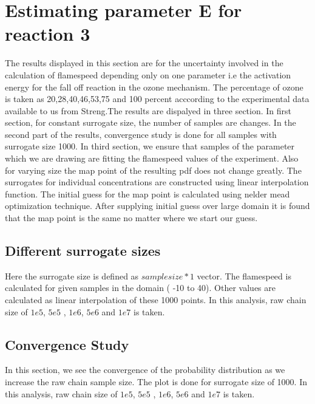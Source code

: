 
\section{Estimating parameter E for reaction 3 }

The results displayed in this section are for the uncertainty involved in the calculation of flamespeed depending only on one parameter i.e the activation energy for the fall off reaction in the ozone mechanism. The percentage of ozone is taken as 20,28,40,46,53,75 and 100  percent acccording to the experimental data available to us from Streng\cite{Streng}.The results are dispalyed in three section. In first section, for constant surrogate size, the number of samples are changes. In the second part of the results, convergence study is done for all samples with surrogate size 1000. In third section, we ensure that samples of the parameter which we are drawing are fitting the flamespeed values of the experiment. Also for varying size the map point of the resulting pdf does not change greatly. The surrogates for individual concentrations are constructed using linear interpolation function. The initial guess for the map point is calculated using nelder mead optimization technique. After supplying initial guess over large domain it is found that the map point is the same no matter where we start our guess. 
\bigskip

\subsection{Different surrogate sizes }

 Here the surrogate size is defined as $sample size*1$ vector. The flamespeed is calculated for given samples in the domain ( -10 to 40). Other values are calculated as linear interpolation of these 1000 points. In this analysis, raw chain size of $1e5$, $5e5$ , $1e6$, $5e6$ and $1e7$ is taken. 






\subsection{Convergence Study }

 In this section, we see the convergence of the probability distribution as we increase the raw chain sample size. The plot is done for surrogate size of 1000. In this analysis, raw chain size of $1e5$, $5e5$ , $1e6$, $5e6$ and $1e7$ is taken. 

